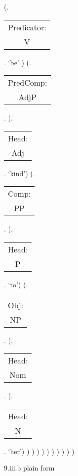 \documentclass[12pt,letterpaper]{article}
\begin{document}
\begin{figure}
\begin{center}
\begin{parsetree}
			(.\begin{tabular}{c}Predicator:\\V\end{tabular}. `\underline{be}' )
			(.\begin{tabular}{c}PredComp:\\AdjP\end{tabular}.
			(.\begin{tabular}{c}Head:\\Adj\end{tabular}. `kind')
			(.\begin{tabular}{c}Comp:\\PP\end{tabular}.
			(.\begin{tabular}{c}Head:\\P\end{tabular}. `to')
			(.\begin{tabular}{c}Obj:\\NP\end{tabular}. 
			(.\begin{tabular}{c}Head:\\Nom\end{tabular}. 
			(.\begin{tabular}{c}Head:\\N\end{tabular}. `her')
			)
			)
			)
			)
			)
			)
			)
			)
			)
			)
			
		\end{parsetree}
		\hfill \break \hfill \break
		9.iii.b plain form
	\end{center}
\end{figure}
\end{document}
